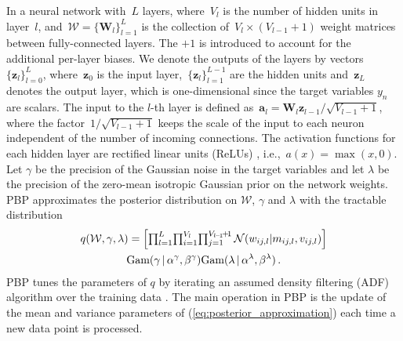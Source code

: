 In a neural network with~$L$ layers, where~$V_l$ is the number of hidden units in layer~$l$, and~${\mathcal{W} = \{ \mathbf{W}_l \}_{l=1}^L}$ is the collection of~${V_l\times (V_{l-1}+1)}$ weight matrices between fully-connected layers. The $+1$ is introduced to account for the additional per-layer biases. We denote the outputs of the layers by vectors~$\{ \mathbf{z}_l \}_{l=0}^{L}$, where~$\mathbf{z}_0$ is the input layer,~${\{\mathbf{z}_l\}_{l=1}^{L-1}}$ are the hidden units and~$\mathbf{z}_L$ denotes the output layer, which is one-dimensional since the target variables $y_n$ are scalars.  
The input to the $l$-th layer is defined as~${\mathbf{a}_l = \mathbf{W}_l \mathbf{z}_{l-1} / \sqrt{V_{l-1}+1} }$,
where the factor~${1/\sqrt{V_{l-1} + 1}}$ keeps the scale of the input to each neuron independent
of the number of incoming connections.
The activation functions for each hidden layer are rectified linear units (ReLUs)
\cite{nair2010rectified}, i.e.,~${a(x) = \max(x,0)}$.
Let $\gamma$ be the precision of the Gaussian noise in the target variables and let $\lambda$
be the precision of the zero-mean isotropic Gaussian prior on the network weights.
PBP approximates the posterior distribution on $\mathcal{W}$, $\gamma$ and $\lambda$ with
the tractable distribution
\begin{multline}
q(\mathcal{W},\gamma, \lambda) = \textstyle \left[ \prod_{l=1}^L\! \prod_{i=1}^{V_l}\! 
\prod_{j=1}^{V_{l\!-\!1}\!+\!1} \mathcal{N}(w_{ij,l}| m_{ij,l},v_{ij,l})\right ]
\\ \text{Gam}(\gamma\,|\, \alpha^\gamma, \beta^\gamma)
\text{Gam}(\lambda\,|\, \alpha^\lambda, \beta^\lambda)\,.\label{eq:posterior_approximation}
\end{multline}
PBP tunes the parameters of $q$ by iterating an assumed
density filtering (ADF) algorithm over the training data \cite{opper1998bayesian}. The main operation in PBP
is the update of the mean and variance parameters of (\ref{eq:posterior_approximation})
each time a new data point is processed. 

